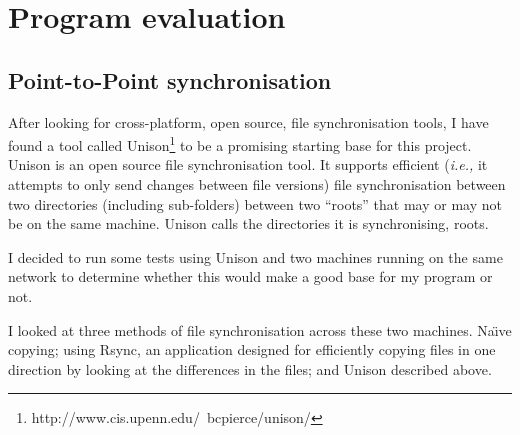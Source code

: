 \documentclass[12pt]{article}
\begin{document}
\newpage
\section{Program evaluation}
\subsection{Point-to-Point synchronisation}
\label{sec:point_to_point}
After looking for cross-platform, open source, file synchronisation
tools, I have found a tool called
Unison\footnote{http://www.cis.upenn.edu/~bcpierce/unison/}
to be a promising starting
base for this project. Unison is an open source file synchronisation tool.
It supports efficient (\emph{i.e.,} it attempts to only send changes between file versions) file synchronisation between two
directories (including sub-folders) between two ``roots''
that may or may not be on the same machine. Unison calls the
directories it is synchronising, roots.

I decided to run some tests using Unison 
and two machines running on the same network to 
determine whether this would make a good base for
my program or not.

I looked at three methods of file synchronisation across
these two machines. Na\"{\i}ve copying; using Rsync, an application
designed for efficiently copying files in one direction by looking at
the differences in the files; and Unison described above.

\end{document}
